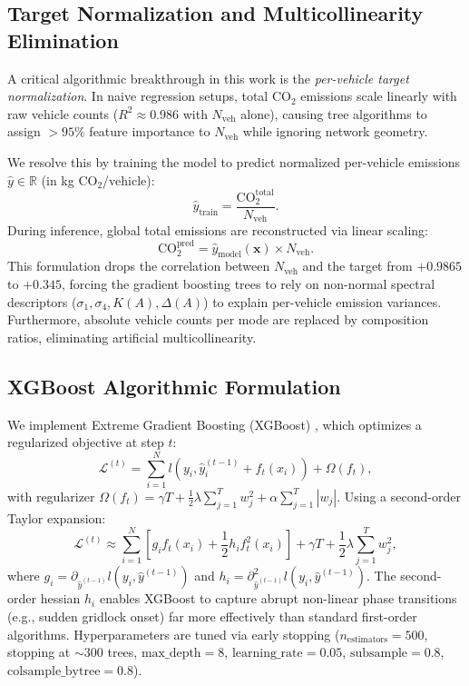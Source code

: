 \documentclass[lettersize,journal]{IEEEtran}
\begin{document}
\subsection{Target Normalization and Multicollinearity Elimination}
A critical algorithmic breakthrough in this work is the \emph{per-vehicle target normalization}. In naive regression setups, total $\text{CO}_2$ emissions scale linearly with raw vehicle counts ($R^2 \approx 0.986$ with $N_{\text{veh}}$ alone), causing tree algorithms to assign $>95\%$ feature importance to $N_{\text{veh}}$ while ignoring network geometry.

We resolve this by training the model to predict normalized per-vehicle emissions $\hat{y} \in \mathbb{R}$ (in kg $\text{CO}_2$/vehicle):
\begin{equation}
\hat{y}_{\text{train}} = \frac{\text{CO}_2^{\text{total}}}{N_{\text{veh}}}.
\end{equation}
During inference, global total emissions are reconstructed via linear scaling:
\begin{equation}
\text{CO}_2^{\text{pred}} = \hat{y}_{\text{model}}(\mathbf{x}) \times N_{\text{veh}}.
\end{equation}
This formulation drops the correlation between $N_{\text{veh}}$ and the target from $+0.9865$ to $+0.345$, forcing the gradient boosting trees to rely on non-normal spectral descriptors ($\sigma_1, \sigma_4, K(A), \Delta(A)$) to explain per-vehicle emission variances. Furthermore, absolute vehicle counts per mode are replaced by composition ratios, eliminating artificial multicollinearity.

\subsection{XGBoost Algorithmic Formulation}
We implement Extreme Gradient Boosting (XGBoost) \cite{Chen2016}, which optimizes a regularized objective at step $t$:
\begin{equation}
\mathcal{L}^{(t)} = \sum_{i=1}^N l\left( y_i, \hat{y}_i^{(t-1)} + f_t(x_i) \right) + \Omega(f_t),
\end{equation}
with regularizer $\Omega(f_t) = \gamma T + \frac{1}{2}\lambda \sum_{j=1}^T w_j^2 + \alpha \sum_{j=1}^T |w_j|$. Using a second-order Taylor expansion:
\begin{equation}
\mathcal{L}^{(t)} \approx \sum_{i=1}^N \left[ g_i f_t(x_i) + \frac{1}{2} h_i f_t^2(x_i) \right] + \gamma T + \frac{1}{2}\lambda \sum_{j=1}^T w_j^2,
\end{equation}
where $g_i = \partial_{\hat{y}^{(t-1)}} l(y_i, \hat{y}^{(t-1)})$ and $h_i = \partial^2_{\hat{y}^{(t-1)}} l(y_i, \hat{y}^{(t-1)})$. The second-order hessian $h_i$ enables XGBoost to capture abrupt non-linear phase transitions (e.g., sudden gridlock onset) far more effectively than standard first-order algorithms. Hyperparameters are tuned via early stopping ($n_{\text{estimators}} = 500$, stopping at $\sim 300$ trees, $\text{max\_depth} = 8$, $\text{learning\_rate} = 0.05$, $\text{subsample} = 0.8$, $\text{colsample\_bytree} = 0.8$).
\end{document}
